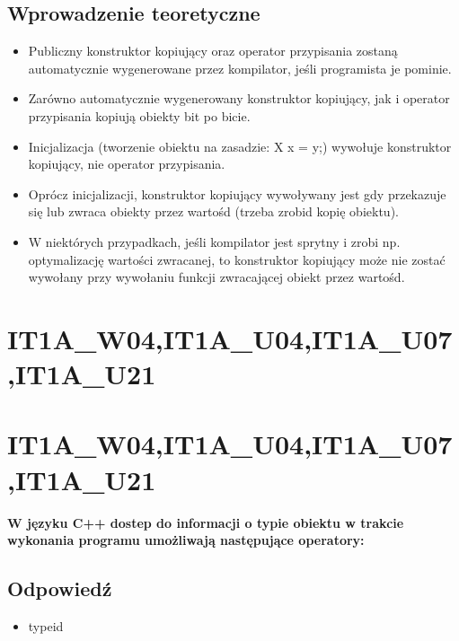\subsection{Wprowadzenie teoretyczne}
\begin{itemize}
\item Publiczny konstruktor kopiujący oraz operator przypisania zostaną automatycznie wygenerowane przez kompilator, jeśli programista je pominie.
\item Zarówno automatycznie wygenerowany konstruktor kopiujący, jak i operator przypisania kopiują obiekty bit po bicie.
\item Inicjalizacja (tworzenie obiektu na zasadzie: X x = y;) wywołuje konstruktor kopiujący, nie operator przypisania.
\item Oprócz inicjalizacji, konstruktor kopiujący wywoływany jest gdy przekazuje się lub zwraca obiekty przez wartośd (trzeba zrobid kopię obiektu).
\item W niektórych przypadkach, jeśli kompilator jest sprytny i zrobi np. optymalizację wartości zwracanej, to konstruktor kopiujący może nie zostać wywołany przy wywołaniu funkcji zwracającej obiekt przez wartośd.
\end{itemize}


\section{IT1A\_W04,IT1A\_U04,IT1A\_U07,IT1A\_U21}


\section{IT1A\_W04,IT1A\_U04,IT1A\_U07,IT1A\_U21}
\textbf{W języku C++ dostep do informacji o typie obiektu w trakcie wykonania programu umożliwają następujące operatory:}

\subsection{Odpowiedź}
\begin{itemize}
\item typeid
\end{itemize}

